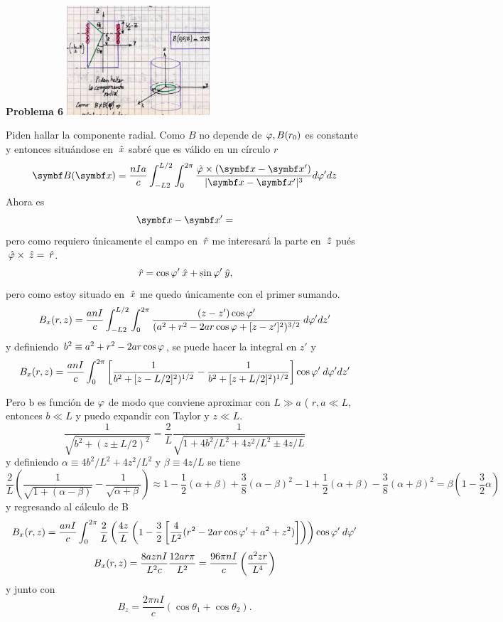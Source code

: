 \documentclass[10pt,oneside]{CBFT_book}
\begin{document}
\begin{ejemplo}{\bf Problema 6}
\includegraphics[width=0.4\textwidth]{images/fig_ft1_setproblemasG1_2.jpg}

Piden hallar la componente radial. Como $B$ no depende de $\varphi, B(r_0)$ es constante y entonces situándose
en $\:\hat{x}$ sabré que es válido en un círculo $r$
\[
	\vb{B}(\vb{x}) =  \frac{nIa}{c}\int_{-L2}^{L/2} \int_0^{2\pi} 
	\frac{\hat{\vp}\times (\vb{x}-\vb{x}')}{|\vb{x}-\vb{x}'|^3} d\vp'dz
\]
Ahora es
\[
	\vb{x}-\vb{x}' =
\]
pero como requiero únicamente el campo en $\:\hat{r}$ me interesará la parte en $\:\hat{z}$ pués $\:\hat{\varphi}\times\:\hat{z}=\:\hat{r}$.
\[
	\:\hat{r} = \cos\varphi'\:\hat{x} + \sin\varphi'\:\hat{y},
\]
pero como estoy situado en $\:\hat{x}$ me quedo únicamente con el primer sumando.
\[
	B_x(r,z) = \frac{anI}{c}\int_{-L2}^{L/2} \int_0^{2\pi} 
	\frac{ (z-z')\cos\varphi' }{ ( a^2 + r^2 - 2ar\cos\varphi + [z-z']^2 )^{3/2} } \: d\varphi' dz' 
\]
y definiendo $b^2 \equiv a^2 + r^2 - 2ar\cos\varphi$, se puede hacer la integral en $z'$ y  
\[
	B_x(r,z) = \frac{anI}{c} \int_0^{2\pi} 
	\left[ \frac{ 1 }{ b^2 + [z-L/2]^2 )^{1/2} } -  \frac{ 1 }{ b^2 + [z+L/2]^2 )^{1/2} }
	\right] \cos\varphi' \: d\varphi' dz' 
\]

Pero b es función de $\varphi$ de modo que conviene aproximar con $L\gg a$ ( $r,a \ll L$, entonces $b \ll L$ y puedo
expandir con Taylor y $z \ll L$.
\[
	\frac{1}{\sqrt{ b^2 + (z \pm L/2 )^2 }} = \frac{2}{L} \frac{1}{\sqrt{ 1 + 4b^2/L^2 + 4z^2/L^2 \pm 4z/L }}
\]
y definiendo $\alpha \equiv 4b^2/L^2 + 4z^2/L^2$ y $\beta \equiv 4z/L$ se tiene 
\[
	\frac{2}{L}( \frac{1}{\sqrt{1 +(\alpha - \beta)}} - \frac{1}{\sqrt{\alpha + \beta}} ) \approx 
	1 - \frac{1}{2}(\alpha + \beta) + \frac{3}{8}(\alpha - \beta)^2 - 1 + \frac{1}{2}(\alpha + \beta) - \frac{3}{8}(\alpha + \beta)^2
	= \beta \left(1 - \frac{3}{2}\alpha \right)
\]
y regresando al cálculo de B
\[
	B_x(r,z) = \frac{a n I}{c} \int_0^{2\pi} \frac{2}{L}
	\left( \frac{4z}{L} \left( 1 - \frac{3}{2} \left[  \frac{4}{L^2}( r^2 - 2 a r \cos\varphi'+ a^2 + z^2 ) 
	\right] \right) \right)
	\cos\varphi'\:d\varphi' 
\]
\[
	B_x(r,z) = \frac{8aznI}{L^2c}\frac{12 ar\pi}{L^2} = \frac{96 \pi n I}{c}\left( \frac{ a^2zr }{ L^4 } \right)
\]
y junto con
\[
	B_z = \frac{2 \pi n I}{ c }( \cos\theta_1 + \cos\theta_2 ).
\]


\end{ejemplo}
\end{document}
